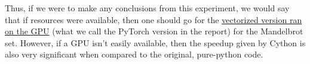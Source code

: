 \documentclass[a4paper,12pt]{article}
\begin{document}
Thus, if we were to make any conclusions from this experiment, we would say that if resources were available, then one should go for the \underline{vectorized version ran on the GPU} (what we call the PyTorch version in the report) for the Mandelbrot set. However, if a GPU isn't easily available, then the speedup given by Cython is also very significant when compared to the original, pure-python code. 



\end{document}
